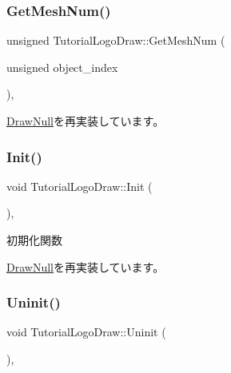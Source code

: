 \subsubsection{\texorpdfstring{Get\+Mesh\+Num()}{GetMeshNum()}}
{\footnotesize\ttfamily unsigned Tutorial\+Logo\+Draw\+::\+Get\+Mesh\+Num (\begin{DoxyParamCaption}\item[{unsigned}]{object\+\_\+index }\end{DoxyParamCaption})\hspace{0.3cm}{\ttfamily [override]}, {\ttfamily [virtual]}}



\mbox{\hyperlink{class_draw_null_ad735978a85a5f3583eecd82d6bfe6413}{Draw\+Null}}を再実装しています。

\mbox{\label{class_tutorial_logo_draw_a53fc4b1b23c7f9e249600be67510f944}} 
\subsubsection{\texorpdfstring{Init()}{Init()}}
{\footnotesize\ttfamily void Tutorial\+Logo\+Draw\+::\+Init (\begin{DoxyParamCaption}{ }\end{DoxyParamCaption})\hspace{0.3cm}{\ttfamily [override]}, {\ttfamily [virtual]}}



初期化関数 



\mbox{\hyperlink{class_draw_null_acd7fef3ccea1da537ac9507ffbb6dd2e}{Draw\+Null}}を再実装しています。

\mbox{\label{class_tutorial_logo_draw_a949fb70954e3df28f87b8ed5c61bf8f1}} 
\subsubsection{\texorpdfstring{Uninit()}{Uninit()}}
{\footnotesize\ttfamily void Tutorial\+Logo\+Draw\+::\+Uninit (\begin{DoxyParamCaption}{ }\end{DoxyParamCaption})\hspace{0.3cm}{\ttfamily [override]}, {\ttfamily [virtual]}}



